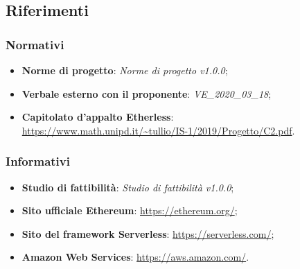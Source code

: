 \subsection{Riferimenti}
\subsubsection{Normativi}
\begin{itemize}
	\item \textbf{Norme di progetto}: \textit{Norme di progetto v1.0.0};
	\item \textbf{Verbale esterno con il proponente}:\textit{ VE\_2020\_03\_18};
	\item \textbf{Capitolato d'appalto Etherless}:\\\url{https://www.math.unipd.it/~tullio/IS-1/2019/Progetto/C2.pdf}.
\end{itemize}
\subsubsection{Informativi}
\begin{itemize}
	\item \textbf{Studio di fattibilità}: \textit{Studio di fattibilità v1.0.0};
	\item \textbf{Sito ufficiale Ethereum}: \url{https://ethereum.org/};
	\item \textbf{Sito del framework Serverless}: \url{https://serverless.com/};
	\item \textbf{Amazon Web Services}: \url{https://aws.amazon.com/}.
\end{itemize}